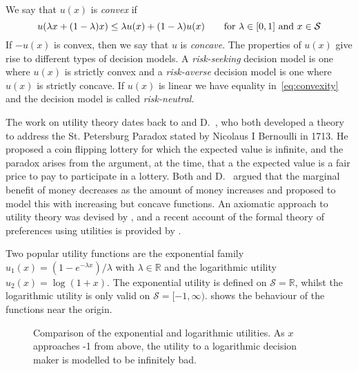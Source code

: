 \documentclass[main.tex]{subfiles}
\begin{document}
\begin{mydef}[Convexity]
  We say that $u(x)$ is \emph{convex} if
  \begin{equation}\label{eq:convexity}
    u(\lambda x + (1-\lambda)x)\leq
    \lambda u(x) + (1-\lambda) u(x)\qquad \textnormal{for $\lambda\in[0,1]$ and
      $x\in\mathcal{S}$}
  \end{equation}
  If $-u(x)$ is convex, then we say that $u$ is
  \emph{concave}.
  The properties of $u(x)$ give rise to different types of decision models.
  A \emph{risk-seeking} decision model is one where $u(x)$
  is strictly convex and a \emph{risk-averse} decision model is one where
  $u(x)$ is strictly concave.
  If $u(x)$ is linear we have equality in~\eqref{eq:convexity} and
  the decision model is called \emph{risk-neutral}.
\end{mydef}

The work on utility theory dates back to \citet{cramer1728utility} and
D.~\citet{bernoulli1738specimen}, who both developed a theory
to address the St. Petersburg Paradox stated by Nicolaus I Bernoulli
in 1713. He proposed a coin flipping lottery for which the
expected value is infinite, and the paradox arises from the
argument, at the time, that a the expected value is a fair price to
pay to participate in a lottery.
Both \citeauthor{cramer1728utility} and
D.~\citeauthor{bernoulli1738specimen} argued that the marginal benefit
of money decreases as the amount of money increases and proposed to
model this with increasing but concave functions.
An axiomatic approach to utility theory was devised by
\citet{neumann1953theory}, and
a recent account of the formal theory of preferences using utilities
is provided by \citet[Ch.~2]{follmer2004stochastic}.

\begin{example}
  Two popular utility functions are the exponential family
  $u_1(x)=(1-e^{-\lambda x})/\lambda$ with $\lambda\in\mathbb{R}$ and the logarithmic
  utility $u_2(x)=\log(1+x)$.
  The exponential utility is defined on $\mathcal{S} =\mathbb{R}$,
  whilst the logarithmic utility is only valid on
  $\mathcal{S}=[-1,\infty)$.
   shows the behaviour of the functions
  near the origin.
  \begin{figure}[htbp]
    \centering
    \caption{Comparison of the exponential and logarithmic
      utilities. As $x$ approaches -1 from above, the utility to a logarithmic
      decision maker is modelled to be infinitely bad.
    }\label{fig:example_utilities}
  \end{figure}
\end{example}
\end{document}
